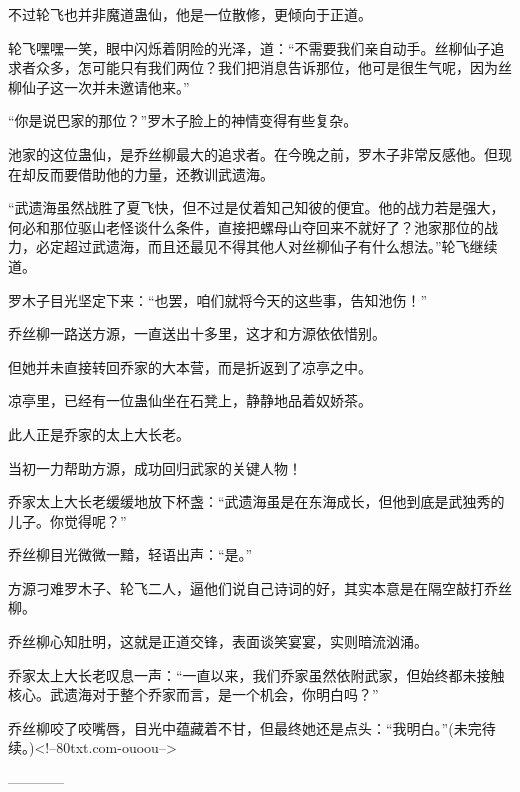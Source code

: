 \begin{this_body}
不过轮飞也并非魔道蛊仙，他是一位散修，更倾向于正道。

轮飞嘿嘿一笑，眼中闪烁着阴险的光泽，道：“不需要我们亲自动手。丝柳仙子追求者众多，怎可能只有我们两位？我们把消息告诉那位，他可是很生气呢，因为丝柳仙子这一次并未邀请他来。”

“你是说巴家的那位？”罗木子脸上的神情变得有些复杂。

池家的这位蛊仙，是乔丝柳最大的追求者。在今晚之前，罗木子非常反感他。但现在却反而要借助他的力量，还教训武遗海。

“武遗海虽然战胜了夏飞快，但不过是仗着知己知彼的便宜。他的战力若是强大，何必和那位驱山老怪谈什么条件，直接把螺母山夺回来不就好了？池家那位的战力，必定超过武遗海，而且还最见不得其他人对丝柳仙子有什么想法。”轮飞继续道。

罗木子目光坚定下来：“也罢，咱们就将今天的这些事，告知池伤！”

乔丝柳一路送方源，一直送出十多里，这才和方源依依惜别。

但她并未直接转回乔家的大本营，而是折返到了凉亭之中。

凉亭里，已经有一位蛊仙坐在石凳上，静静地品着奴娇茶。

此人正是乔家的太上大长老。

当初一力帮助方源，成功回归武家的关键人物！

乔家太上大长老缓缓地放下杯盏：“武遗海虽是在东海成长，但他到底是武独秀的儿子。你觉得呢？”

乔丝柳目光微微一黯，轻语出声：“是。”

方源刁难罗木子、轮飞二人，逼他们说自己诗词的好，其实本意是在隔空敲打乔丝柳。

乔丝柳心知肚明，这就是正道交锋，表面谈笑宴宴，实则暗流汹涌。

乔家太上大长老叹息一声：“一直以来，我们乔家虽然依附武家，但始终都未接触核心。武遗海对于整个乔家而言，是一个机会，你明白吗？”

乔丝柳咬了咬嘴唇，目光中蕴藏着不甘，但最终她还是点头：“我明白。”(未完待续。)<!--80txt.com-ouoou-->

------------

\end{this_body}

